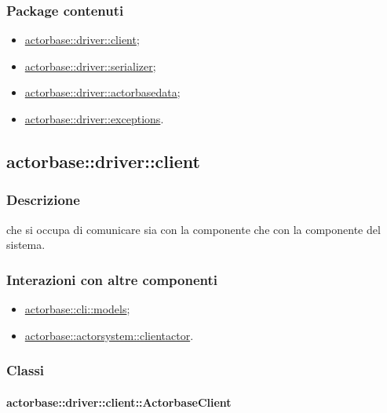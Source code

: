 \documentclass{scalatekids-article}
\begin{document}
\subsubsection{Package contenuti}

\begin{itemize}
\item \hyperref[sec:actorbase::driver::client]{actorbase::driver::client};
\item \hyperref[sec:actorbase::driver::serializer]{actorbase::driver::serializer};
\item \hyperref[sec:actorbase::driver::actorbasedata]{actorbase::driver::actorbasedata};
\item \hyperref[sec:actorbase::driver::exceptions]{actorbase::driver::exceptions}.
\end{itemize}

\subsection{actorbase::driver::client}
\label{sec:actorbase::driver::client}

\subsubsection{Descrizione}

 che si occupa di comunicare sia con la componente 
che con la componente  del sistema.

\subsubsection{Interazioni con altre componenti}

\begin{itemize}
\item \hyperref[sec:actorbase::cli::models]{actorbase::cli::models};
\item \hyperref[sec:actorbase::actorsystem::clientactor]{actorbase::actorsystem::clientactor}.
\end{itemize}

\subsubsection{Classi}

\paragraph{actorbase::driver::client::ActorbaseClient}
\label{sec:actorbase::driver::client::ActorbaseClient}
\end{document}
